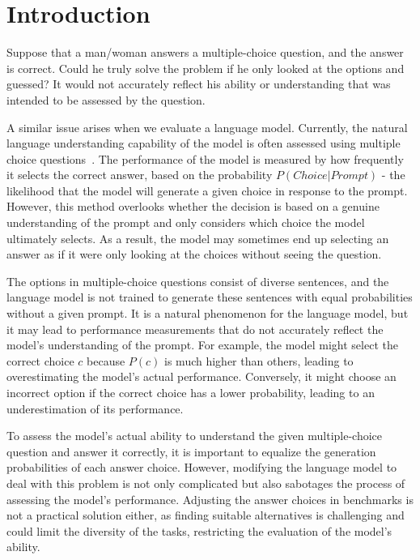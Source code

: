\section{Introduction} 
Suppose that a man/woman answers a multiple-choice question, and the answer is correct. Could he truly solve the problem if he only looked at the options and guessed? It would not accurately reflect his ability or understanding that was intended to be assessed by the question. 

A similar issue arises when we evaluate a language model. Currently, the natural language understanding capability of the model is often assessed using multiple choice questions~\citep{achiam2023gpt, team2023gemini, jiang2024mixtral, dubey2024llama}. The performance of the model is measured by how frequently it selects the correct answer, based on the probability {\small $P(Choice|Prompt)$} - the likelihood that the model will generate a given choice in response to the prompt. However, this method overlooks whether the decision is based on a genuine understanding of the prompt and only considers which choice the model ultimately selects. As a result, the model may sometimes end up selecting an answer as if it were only looking at the choices without seeing the question.


The options in multiple-choice questions consist of diverse sentences, and the language model is not trained to generate these sentences with equal probabilities without a given prompt. It is a natural phenomenon for the language model, but it may lead to performance measurements that do not accurately reflect the model's understanding of the prompt. For example, the model might select the correct choice $c$ because {\small $P(c)$} is much higher than others, leading to overestimating the model's actual performance. Conversely, it might choose an incorrect option if the correct choice has a lower probability, leading to an underestimation of its performance. 

To assess the model's actual ability to understand the given multiple-choice question and answer it correctly, it is important to equalize the generation probabilities of each answer choice. However, modifying the language model to deal with this problem is not only complicated but also sabotages the process of assessing the model's performance. Adjusting the answer choices in benchmarks is not a practical solution either, as finding suitable alternatives is challenging and could limit the diversity of the tasks, restricting the evaluation of the model's ability.

